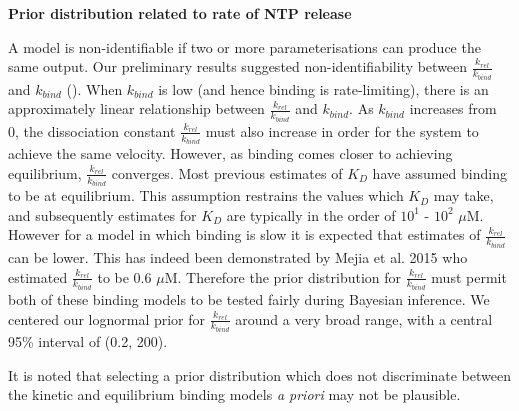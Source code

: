 \documentclass[10pt,letterpaper]{article}
\newenvironment{changemargin}[2]{%
\begin{list}{}{%
\setlength{\topsep}{0pt}%
\setlength{\leftmargin}{#1}%
\setlength{\rightmargin}{#2}%
\setlength{\listparindent}{\parindent}%
\setlength\textit{emindent}{\parindent}%
\setlength{\parsep}{\parskip}%
}%
\item[]}{\end{list}}
\begin{document}
\textbf{Prior distribution related to rate of NTP release} \par


A model is non-identifiable if two or more parameterisations can produce the same output. Our preliminary results suggested non-identifiability between $\frac{k_{rel}}{k_{bind}}$ and $k_{bind}$ (). When $k_{bind}$ is low (and hence binding is rate-limiting), there is an approximately linear relationship between $\frac{k_{rel}}{k_{bind}}$ and $k_{bind}$. As $k_{bind}$ increases from 0, the dissociation constant $\frac{k_{rel}}{k_{bind}}$ must also increase in order for the system to achieve the same velocity. However, as binding comes closer to achieving equilibrium, $\frac{k_{rel}}{k_{bind}}$ converges. Most previous estimates of $K_D$ have assumed binding to be at equilibrium. This assumption restrains the values which $K_D$ may take, and subsequently estimates for $K_D$ are typically in the order of $10^1$ - $10^2$ $\mu$M. However for a model in which binding is slow it is expected that estimates of $\frac{k_{rel}}{k_{bind}}$ can be lower. This has indeed been demonstrated by Mejia et al. 2015 \cite{mejia2015trigger} who estimated $\frac{k_{rel}}{k_{bind}}$ to be $0.6$ $
\mu$M. Therefore the prior distribution for $\frac{k_{rel}}{k_{bind}}$ must permit both of these binding models to be tested fairly during Bayesian inference. We centered our lognormal prior for $\frac{k_{rel}}{k_{bind}}$ around a very broad range, with a central 95\% interval of (0.2, 200).

It is noted that selecting a prior distribution which does not discriminate between the kinetic and equilibrium binding models \textit{a priori} may not be plausible.









\end{document}
